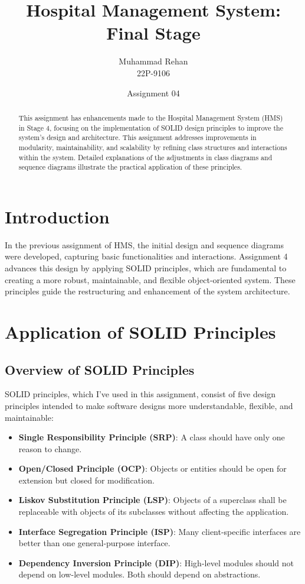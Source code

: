 \documentclass[12pt]{article}
\title{Hospital Management System: Final Stage }
\author{Muhammad Rehan \\ 22P-9106}
\date{Assignment 04}
\begin{document}
\maketitle

\begin{abstract}
This assignment has enhancements made to the Hospital Management System (HMS) in Stage 4, focusing on the implementation of SOLID design principles to improve the system’s design and architecture. This assignment addresses improvements in modularity, maintainability, and scalability by refining class structures and interactions within the system. Detailed explanations of the adjustments in class diagrams and sequence diagrams illustrate the practical application of these principles.
\end{abstract}

\section*{Introduction}
In the previous assignment of HMS, the initial design and sequence diagrams were developed, capturing basic functionalities and interactions. Assignment 4 advances this design by applying SOLID principles, which are fundamental to creating a more robust, maintainable, and flexible object-oriented system. These principles guide the restructuring and enhancement of the system architecture.

\section*{Application of SOLID Principles}
\subsection*{Overview of SOLID Principles}
SOLID principles, which I've used in this assignment, consist of five design principles intended to make software designs more understandable, flexible, and maintainable:
\begin{itemize}
    \item \textbf{Single Responsibility Principle (SRP)}: A class should have only one reason to change.
    \item \textbf{Open/Closed Principle (OCP)}: Objects or entities should be open for extension but closed for modification.
    \item \textbf{Liskov Substitution Principle (LSP)}: Objects of a superclass shall be replaceable with objects of its subclasses without affecting the application.
    \item \textbf{Interface Segregation Principle (ISP)}: Many client-specific interfaces are better than one general-purpose interface.
    \item \textbf{Dependency Inversion Principle (DIP)}: High-level modules should not depend on low-level modules. Both should depend on abstractions.
\end{itemize}
\end{document}
